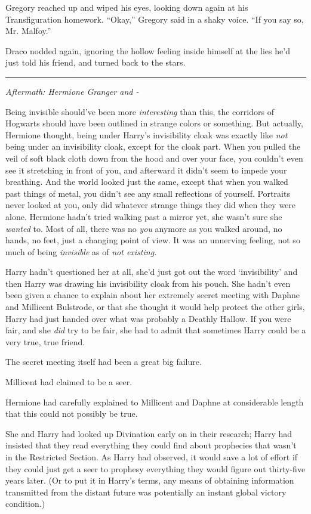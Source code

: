 Gregory reached up and wiped his eyes, looking down again at his
Transfiguration homework. ``Okay,'' Gregory said in a shaky voice. ``If
you say so, Mr. Malfoy.''

Draco nodded again, ignoring the hollow feeling inside himself at the
lies he'd just told his friend, and turned back to the stars.

\begin{center}\rule{3in}{0.4pt}\end{center}

\emph{Aftermath: Hermione Granger and -}

Being invisible should've been more \emph{interesting} than this, the
corridors of Hogwarts should have been outlined in strange colors or
something. But actually, Hermione thought, being under Harry's
invisibility cloak was exactly like \emph{not} being under an
invisibility cloak, except for the cloak part. When you pulled the veil
of soft black cloth down from the hood and over your face, you couldn't
even see it stretching in front of you, and afterward it didn't seem to
impede your breathing. And the world looked just the same, except that
when you walked past things of metal, you didn't see any small
reflections of yourself. Portraits never looked at you, only did
whatever strange things they did when they were alone. Hermione hadn't
tried walking past a mirror yet, she wasn't sure she \emph{wanted} to.
Most of all, there was no \emph{you} anymore as you walked around, no
hands, no feet, just a changing point of view. It was an unnerving
feeling, not so much of being \emph{invisible} as of \emph{not
existing.}

Harry hadn't questioned her at all, she'd just got out the word
`invisibility' and then Harry was drawing his invisibility cloak from
his pouch. She hadn't even been given a chance to explain about her
extremely secret meeting with Daphne and Millicent Bulstrode, or that
she thought it would help protect the other girls, Harry had just handed
over what was probably a Deathly Hallow. If you were fair, and she
\emph{did} try to be fair, she had to admit that sometimes Harry could
be a very true, true friend.

The secret meeting itself had been a great big failure.

Millicent had claimed to be a seer.

Hermione had carefully explained to Millicent and Daphne at considerable
length that this could not possibly be true.

She and Harry had looked up Divination early on in their research; Harry
had insisted that they read everything they could find about prophecies
that wasn't in the Restricted Section. As Harry had observed, it would
save a lot of effort if they could just get a seer to prophesy
everything they would figure out thirty-five years later. (Or to put it
in Harry's terms, any means of obtaining information transmitted from
the distant future was potentially an instant global victory condition.)

